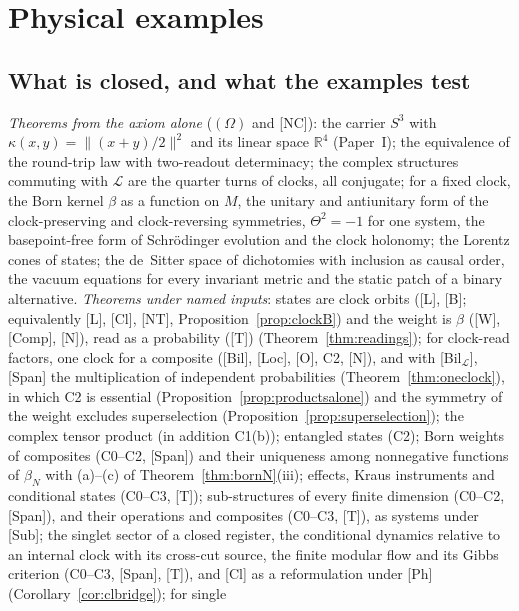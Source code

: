 \documentclass[aps,pra,onecolumn,superscriptaddress,nofootinbib,10pt]{revtex4-2}
\theoremstyle{definition}
\theoremstyle{remark}
\newcommand{\R}{\mathbb{R}}
\newcommand{\cL}{\mathcal{L}}
\begin{document}
\section{Physical examples}\label{sec:examples}

\subsection{What is closed, and what the examples test}\label{sec:closed}
\emph{Theorems from the axiom alone} ($(\Omega)$ and [NC]): the carrier $S^3$ with $\kappa(x,y)=\lVert(x+y)/2\rVert^2$
and its linear space $\R^4$ (Paper~I); the equivalence of the round-trip law with two-readout
determinacy; the complex structures commuting with $\cL$ are the quarter turns of clocks, all conjugate;
for a fixed clock, the Born kernel $\beta$ as a function on $M$, the unitary and antiunitary form of the
clock-preserving and clock-reversing symmetries, $\Theta^2=-1$ for one system, the basepoint-free form of
Schr\"odinger evolution and the clock holonomy; the Lorentz cones of states; the de~Sitter space of
dichotomies with inclusion as causal order, the vacuum equations for every invariant metric and the
static patch of a binary alternative.
\emph{Theorems under named inputs}: states are clock orbits ([L], [B]; equivalently [L], [Cl], [NT],
Proposition~\ref{prop:clockB}) and the weight is
$\beta$ ([W], [Comp], [N]), read as a probability ([T]) (Theorem~\ref{thm:readings}); for clock-read factors, one clock for
a composite ([Bil], [Loc], [O], C2, [N]), and with [Bil$_\cL$], [Span] the multiplication of independent
probabilities (Theorem~\ref{thm:oneclock}), in which C2 is essential (Proposition~\ref{prop:productsalone}) and the
symmetry of the weight excludes superselection (Proposition~\ref{prop:superselection}); the complex tensor
product (in addition C1(b)); entangled states (C2); Born weights of composites (C0--C2, [Span]) and their
uniqueness among nonnegative functions of $\beta_N$ with (a)--(c) of Theorem~\ref{thm:bornN}(iii); effects, Kraus
instruments and conditional states (C0--C3, [T]); sub-structures of every finite dimension (C0--C2, [Span]),
and their operations and composites (C0--C3, [T]), as systems under [Sub]; the singlet sector of a closed
register, the conditional dynamics relative to an internal clock with its cross-cut source, the finite
modular flow and its Gibbs criterion (C0--C3, [Span], [T]), and [Cl] as a reformulation under [Ph] (Corollary~\ref{cor:clbridge}); for single
\end{document}
